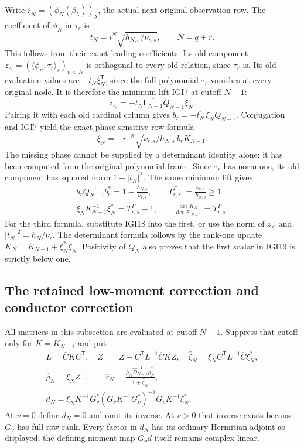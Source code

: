 \documentclass[11pt,a4paper]{article}
\begin{document}
Write $\xi_N=(\phi_N(\beta_\lambda))_\lambda$, the actual next
original observation row. The coefficient of $\phi_N$ in
$\tau_r$ is
\[
 t_N=i^N\sqrt{h_{N,s}/\nu_{r,s}},\qquad N=q+r.             \tag{IGI17}
\]
This follows from their exact leading coefficients. Its old
component $z_<=(\langle\phi_n,\tau_r\rangle_s)_{n<N}$ is
orthogonal to every old relation, since $\tau_r$ is. Its old
evaluation values are $-t_N\xi_N^{\mathsf T}$, since the full
polynomial $\tau_r$ vanishes at every original node. It is
therefore the minimum lift IGI7 at cutoff $N-1$:
\[
 z_<=-t_N\overline{\mathsf E_{N-1}}Q_{N-1}\xi_N^{\mathsf T}.
\]
Pairing it with each old cardinal column gives
$b_r=-\overline{t_N}\,\overline{\xi_N}Q_{N-1}$.
Conjugation and IGI7 yield the exact phase-sensitive row formula
\[
 \boxed{\quad
 \xi_N=-i^{-N}\sqrt{\nu_{r,s}/h_{N,s}}\,\overline{b_r}K_{N-1}.
 \quad}                                                        \tag{IGI18}
\]
The missing phase cannot be supplied by a determinant identity
alone; it has been computed from the original polynomial frame.
Since $\tau_r$ has norm one, its old component has squared norm
$1-|t_N|^2$. The same minimum lift gives
\[
\begin{gathered}
 b_rQ_{N-1}^{-1}b_r^*=1-\frac{h_{N,s}}{\nu_{r,s}},\qquad
 T_{r,s}^\Gamma:=\frac{\nu_{r,s}}{h_{N,s}}\ge1,\\
 \xi_NK_{N-1}^{-1}\xi_N^*=T_{r,s}^\Gamma-1,\qquad
 \frac{\det K_N}{\det K_{N-1}}=T_{r,s}^\Gamma.
\end{gathered}                                                    \tag{IGI19}
\]
For the third formula, substitute IGI18 into the first, or use
the norm of $z_<$ and $|t_N|^2=h_N/\nu_r$. The determinant
formula follows by the rank-one update
$K_N=K_{N-1}+\xi_N^*\xi_N$. Positivity of $Q_N$ also proves
that the first scalar in IGI19 is strictly below one.

\subsection{The retained low-moment correction and conductor correction}
All matrices in this subsection are evaluated at cutoff $N-1$.
Suppress that cutoff only for $K=K_{N-1}$ and put
\[
\begin{gathered}
 L=\overline C KC^{\mathsf T},\quad
 Z_\perp=Z-C^{\mathsf T}L^{-1}\overline C KZ,\quad
 \widehat\zeta_N=\xi_NC^{\mathsf T}L^{-1}\overline C\xi_N^*,\\
 \widehat\rho_N=\xi_NZ_\perp,
 \qquad \widehat r_N=
       \frac{\widehat\rho_N\widehat D_{N-1}^{-1}\widehat\rho_N^*}
            {1+\widehat\zeta_N},\\
 d_N=\xi_NK^{-1}G_v^*(G_vK^{-1}G_v^*)^{-1}
                              G_vK^{-1}\xi_N^* .
\end{gathered}                                                    \tag{IGI20}
\]
At $v=0$ define $d_N=0$ and omit its inverse. At $v>0$ that inverse
exists because $G_v$ has full row rank. Every factor in $d_N$ has
its ordinary Hermitian adjoint as displayed; the defining moment
map $G_vd$ itself remains complex-linear.
\end{document}
